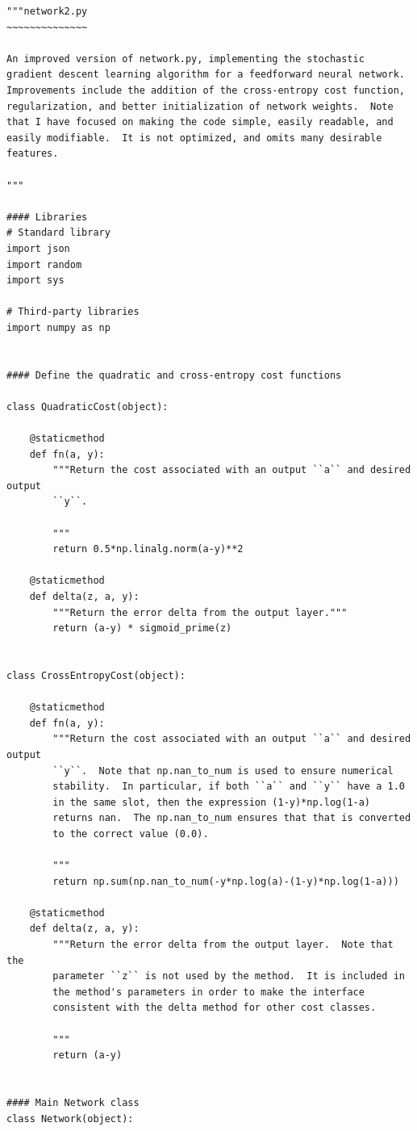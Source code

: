\begin{lstlisting}
"""network2.py
~~~~~~~~~~~~~~

An improved version of network.py, implementing the stochastic
gradient descent learning algorithm for a feedforward neural network.
Improvements include the addition of the cross-entropy cost function,
regularization, and better initialization of network weights.  Note
that I have focused on making the code simple, easily readable, and
easily modifiable.  It is not optimized, and omits many desirable
features.

"""

#### Libraries
# Standard library
import json
import random
import sys

# Third-party libraries
import numpy as np


#### Define the quadratic and cross-entropy cost functions

class QuadraticCost(object):

    @staticmethod
    def fn(a, y):
        """Return the cost associated with an output ``a`` and desired output
        ``y``.

        """
        return 0.5*np.linalg.norm(a-y)**2

    @staticmethod
    def delta(z, a, y):
        """Return the error delta from the output layer."""
        return (a-y) * sigmoid_prime(z)


class CrossEntropyCost(object):

    @staticmethod
    def fn(a, y):
        """Return the cost associated with an output ``a`` and desired output
        ``y``.  Note that np.nan_to_num is used to ensure numerical
        stability.  In particular, if both ``a`` and ``y`` have a 1.0
        in the same slot, then the expression (1-y)*np.log(1-a)
        returns nan.  The np.nan_to_num ensures that that is converted
        to the correct value (0.0).

        """
        return np.sum(np.nan_to_num(-y*np.log(a)-(1-y)*np.log(1-a)))

    @staticmethod
    def delta(z, a, y):
        """Return the error delta from the output layer.  Note that the
        parameter ``z`` is not used by the method.  It is included in
        the method's parameters in order to make the interface
        consistent with the delta method for other cost classes.

        """
        return (a-y)


#### Main Network class
class Network(object):


\end{lstlisting}
